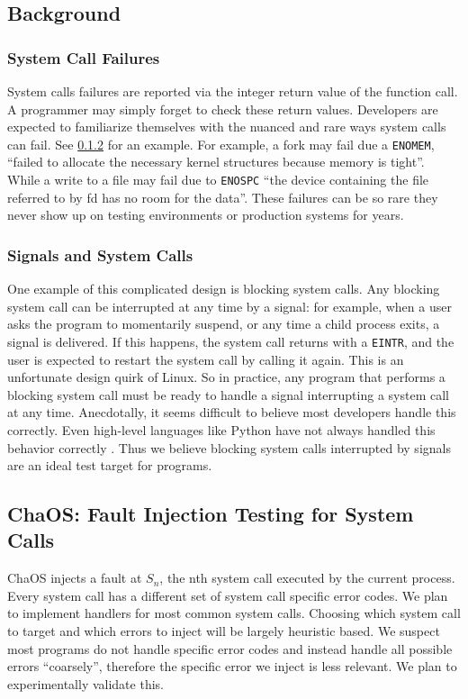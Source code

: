 \subsection{Background}

\subsubsection{System Call Failures}

System calls failures are reported via the integer return value of the function call. A programmer may simply forget to check these return values. Developers are expected to familiarize themselves with the nuanced and rare ways system calls can fail. See \ref{blockingandsignals} for an example. For example, a fork may fail due a \texttt{ENOMEM}, ``failed to allocate the necessary kernel structures because memory is tight''. While a write to a file may fail due to \texttt{ENOSPC} ``the device containing the file referred to by fd has no room for the data''. These failures can be so rare they never show up on testing environments or production systems for years.

\subsubsection{Signals and System Calls}
\label{blockingandsignals}
One example of this complicated design is blocking system calls. Any blocking system call can be interrupted at any time by a signal: for example, when a user asks the program to momentarily suspend, or any time a child process exits, a signal is delivered. If this happens, the system call returns with a \texttt{EINTR}, and the user is expected to restart the system call by calling it again. This is an unfortunate design quirk of Linux. So in practice, any program that performs a blocking system call must be ready to handle a signal interrupting a system call at any time. Anecdotally, it seems difficult to believe most developers handle this correctly. Even high-level languages like Python have not always handled this behavior correctly \cite{pep}. Thus we believe blocking system calls interrupted by signals are an ideal test target for programs.


\subsection{ChaOS: Fault Injection Testing for System Calls}     
ChaOS injects a fault at $S_n$, the nth system call executed by the current process. Every system call has a different set of system call specific error codes. We plan to implement handlers for most common system calls. Choosing which system call to target and which errors to inject will be largely heuristic based. We suspect most programs do not handle specific error codes and instead handle all possible errors ``coarsely'', therefore the specific error we inject is less relevant. We plan to experimentally validate this.

